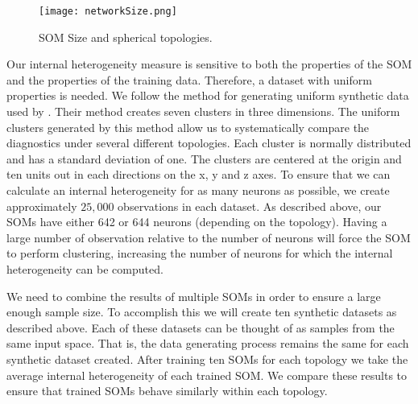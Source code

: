 \begin{figure}[htb]
  \begin{center}
\caption{SOM Size and spherical topologies.}
\label{fig:nSize}
\texttt{[image: networkSize.png]}
\end{center}
\end{figure}

Our internal heterogeneity measure is sensitive to both the properties of the SOM 
and the properties of the training data. Therefore, a dataset with uniform
properties is needed. We follow the method for generating uniform synthetic
data used by \cite{wu2006}.  Their method creates seven clusters in three
dimensions.  The uniform clusters generated by this method allow us to
systematically compare the diagnostics under several different topologies.
Each cluster is normally distributed and has a standard deviation of one.  The 
clusters are centered at the origin and ten units out in each directions on
the x, y and z axes. To ensure that we can calculate an internal heterogeneity
for as many neurons as possible, we create approximately $25,000$ observations
in each dataset.  As described above, our SOMs have either 642 
or 644 neurons (depending on the topology).  Having a large number of
observation relative to the number of neurons will force the SOM to perform
clustering, increasing the number of neurons for which the internal
heterogeneity can be computed.

We need to combine the results of multiple SOMs in order to ensure a large
enough sample size.  To accomplish this we will create ten synthetic datasets
as described above.  Each of these datasets can be thought of as samples from
the same input space.  That is, the data generating process remains the same
for each synthetic dataset created.  After training ten SOMs for each topology
we take the average internal heterogeneity of each trained SOM.  We compare
these results to ensure that trained SOMs behave similarly within each
topology.
